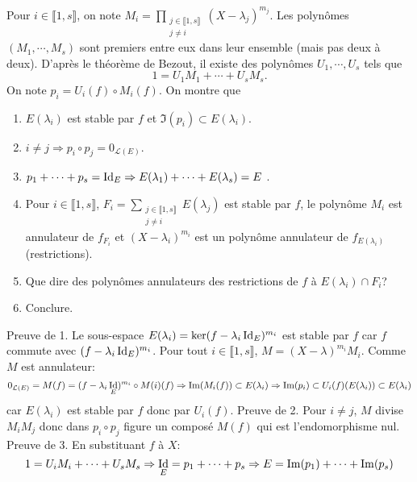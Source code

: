 \begin{demo}
  Pour $i\in \llbracket 1, s \rrbracket$, on note $M_i = \prod_{\substack{ j \in \llbracket 1,s \rrbracket \\ j \neq i}} (X- \lambda_j)^{m_j}$. Les polynômes $(M_1, \cdots, M_s)$ sont premiers entre eux dans leur ensemble (mais pas deux à deux). D'après le théorème de Bezout, il existe des polynômes $U_1, \cdots , U_s$ tels que 
\[
  1 = U_1 M_1 + \cdots +U_s M_s.
\]
On note $p_i = U_i(f) \circ M_i(f)$. On montre que 
\begin{enumerate}
  \item $E(\lambda_i)$ est stable par $f$ et $\Im(p_i) \subset E(\lambda_i)$. 
  \item $ i\neq j \Rightarrow p_i \circ p_j = 0_{\mathcal{L}(E)}$.
  \item $p_1 + \cdots + p_s = \mathop{\mathrm{Id}}_E \Rightarrow E(\lambda_1)+ \cdots + E(\lambda_s) = E$ .
  \item Pour $i \in \llbracket 1,s\rrbracket$, $F_i = \sum_{\substack{j \in \llbracket 1,s\rrbracket \\ j \neq i}}E(\lambda_j)$ est stable par $f$, le polynôme $M_i$ est annulateur de $f_{F_i}$ et $(X- \lambda_i)^{m_i}$ est un polynôme annulateur de $f_{E(\lambda_i)}$ (restrictions).
  \item Que dire des polynômes annulateurs des restrictions de $f$ à $E(\lambda_i)\cap F_i$?
  \item Conclure.
\end{enumerate}
Preuve de 1.\newline
Le sous-espace $E(\lambda_i) = \ker(f- \lambda_i\mathop{\mathrm{Id}}_E)^{m_i}$ est stable par $f$ car $f$ commute avec $(f- \lambda_i\mathop{\mathrm{Id}}_E)^{m_i}$.\newline
Pour tout $i \in \llbracket 1,s \rrbracket$, $M = (X-\lambda)^{m_i}M_i$. Comme $M$ est annulateur: 
\[
  0_{\mathcal{L}(E)} = M(f) = (f-\lambda_i \mathop{\mathrm{Id}}_E)^{m_i}\circ M(i)(f) \Rightarrow \mathop{\mathrm{Im}}(M_i(f))\subset E(\lambda_i)
  \Rightarrow \mathop{\mathrm{Im}}(p_i) \subset U_i(f)(E(\lambda_i)) \subset E(\lambda_i)
\]
car $E(\lambda_i)$ est stable par $f$ donc par $U_i(f)$.\medskip\newline
Preuve de 2.\newline
Pour $i\neq j$, $M$ divise $M_i M_j$ donc dans $p_i\circ p_j$ figure un composé $M(f)$ qui est l'endomorphisme nul.\medskip\newline
Preuve de 3.\newline
En substituant $f$ à $X$:
\[
  1 = U_iM_i + \cdots + U_sM_s\Rightarrow \mathop{\mathrm{Id}}_E = p_1 + \cdots + p_s \Rightarrow E = \mathop{\mathrm{Im}}(p_1) + \cdots +\mathop{\mathrm{Im}}(p_s)
\]
\end{demo}

